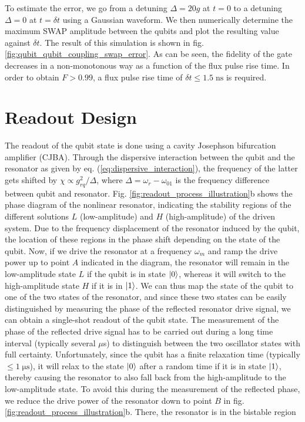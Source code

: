 To estimate the error, we go from a detuning $\Delta = 20 g$ at $t=0$ to a detuning $\Delta=0$ at $t=\delta t$ using a Gaussian waveform. We then numerically determine the maximum SWAP amplitude between the qubits and plot the resulting value against $\delta t$. The result of this simulation is shown in fig. \ref{fig:qubit_qubit_coupling_swap_error}. As can be seen, the fidelity of the gate decreases in a non-monotonous way as a function of the flux pulse rise time. In order to obtain $F>0.99$, a flux pulse rise time of $\delta t \le 1.5\;\mathrm{ns}$ is required.

\section{Readout Design}

The readout of the qubit state is done using a cavity Josephson bifurcation amplifier (CJBA). Through the dispersive interaction between the qubit and the resonator as given by eq. (\ref{eq:dispersive_interaction}), the frequency of the latter gets shifted by $\chi\propto g_{rq}^2/\Delta$, where $\Delta=\omega_r-\omega_{01}$ is the frequency difference between qubit and resonator. Fig. \ref{fig:readout_process_illustration}b shows the phase diagram of the nonlinear resonator, indicating the stability regions of the different solutions $L$ (low-amplitude) and $H$ (high-amplitude) of the driven system. Due to the frequency displacement of the resonator induced by the qubit, the location of these regions in the phase shift depending on the state of the qubit. Now, if we drive the resonator at a frequency $\omega_m$ and ramp the drive power up to point $A$ indicated in the diagram, the resonator will remain in the low-amplitude state $L$ if the qubit is in state $\left| 0 \right>$, whereas it will switch to the high-amplitude state $H$ if it is in $\left| 1 \right>$. We can thus map the state of the qubit to one of the two states of the resonator, and since these two states can be easily distinguished by measuring the phase of the reflected resonator drive signal, we can obtain a single-shot readout of the qubit state. The measurement of the phase of the reflected drive signal has to be carried out during a long time interval (typically several $\mu$s) to distinguish between the two oscillator states with full certainty. Unfortunately, since the qubit has a finite relaxation time (typically $\le 1\;\mathrm{\mu s}$), it will relax to the state $\left| 0 \right>$ after a random time if it is in state $\left| 1 \right>$, thereby causing the resonator to also fall back from the high-amplitude to the low-amplitude state. To avoid this during the measurement of the reflected phase, we reduce the drive power of the resonator down to point $B$ in fig. \ref{fig:readout_process_illustration}b. There, the resonator is in the bistable region 